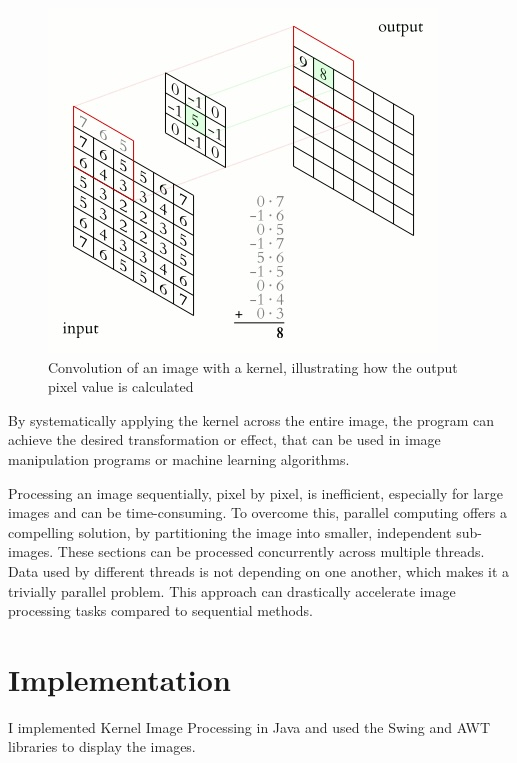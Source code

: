 \documentclass{article}
\begin{document}
\begin{multicols}{2}
    \begin{figure}[H]
        \centering
        \includegraphics[width=\linewidth]{img/kernel.jpg}
        \caption{Convolution of an image with a kernel, illustrating how the output pixel value is calculated}
        \label{fig:Kernel}
    \end{figure}

    By systematically applying the kernel across the entire image, the program can achieve the desired transformation or effect, that can be used in image manipulation programs or machine learning algorithms.

    Processing an image sequentially, pixel by pixel, is inefficient, especially for large images and can be time-consuming. To overcome this, parallel computing offers a compelling solution, by partitioning the image into smaller, independent sub-images. These sections can be processed concurrently across multiple threads. Data used by different threads is not depending on one another, which makes it a trivially parallel problem. This approach can drastically accelerate image processing tasks compared to sequential methods.

    \section{Implementation}
    I implemented Kernel Image Processing in Java and used the Swing and AWT libraries to display the images.


\end{multicols}
\end{document}
